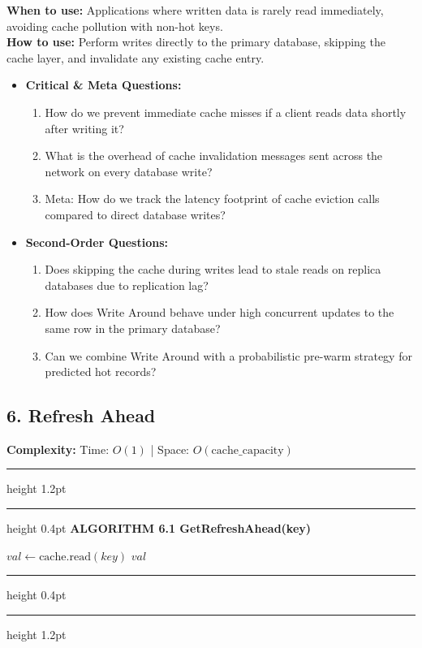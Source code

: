 \documentclass[11pt,a4paper]{article}
\newenvironment{textbookalgo}[2]{%
  \par\addvspace{1.2em}\noindent
  \hrule height 1.2pt
  \vspace{1.5pt}
  \hrule height 0.4pt
  \vspace{5pt}
  {\noindent\large\bfseries\sffamily ALGORITHM #1 \quad #2}
  \par\vspace{5pt}
  \RestyleAlgo{plain}
}{%
  \par\vspace{4pt}
  \hrule height 0.4pt
  \vspace{1.5pt}
  \hrule height 1.2pt
  \par\addvspace{1.2em}
}
\theoremstyle{definition}
\begin{document}
\noindent
\textbf{When to use:} Applications where written data is rarely read immediately, avoiding cache pollution with non-hot keys.\\
\textbf{How to use:} Perform writes directly to the primary database, skipping the cache layer, and invalidate any existing cache entry.
\begin{itemize}[leftmargin=*]
  \item[] \textbf{Critical \& Meta Questions:}
  \begin{enumerate}
  \item How do we prevent immediate cache misses if a client reads data shortly after writing it?
  \item What is the overhead of cache invalidation messages sent across the network on every database write?
  \item Meta: How do we track the latency footprint of cache eviction calls compared to direct database writes?
  \end{enumerate}
  \item[] \textbf{Second-Order Questions:}
  \begin{enumerate}
  \item Does skipping the cache during writes lead to stale reads on replica databases due to replication lag?
  \item How does Write Around behave under high concurrent updates to the same row in the primary database?
  \item Can we combine Write Around with a probabilistic pre-warm strategy for predicted hot records?
  \end{enumerate}
\end{itemize}
\medskip

\clearpage
\subsection{6. Refresh Ahead}

\noindent
\textbf{Complexity:} Time: $O(1)$ | Space: $O(\text{cache\_capacity})$
\smallskip

\begin{textbookalgo}{6.1}{GetRefreshAhead(key)}
\begin{algorithm}[H]
$val \leftarrow \text{cache.read}(key)$\;
\Return $val$\;
\end{algorithm}
\end{textbookalgo}
\end{document}
